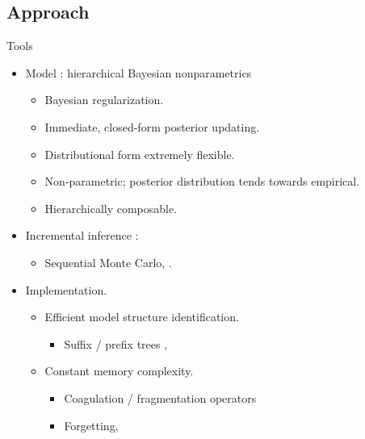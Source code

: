 \documentclass{beamer}
\begin{document}
\subsection{Approach}
\begin{frame}[t]{Tools}
\begin{itemize}
\item Model : hierarchical Bayesian nonparametrics \cite{Teh2006b}
\begin{itemize}
\item Bayesian regularization.
\item Immediate, closed-form posterior updating.
\item Distributional form extremely flexible.
\item Non-parametric; posterior distribution tends towards empirical. 
\item Hierarchically composable.
\end{itemize}
\item Incremental inference : \cite{Doucet2001,Liu2001,MacEachern1999}
\begin{itemize}
\item  Sequential Monte Carlo,  \citet{Wood2007,Wood2008,Wood2008b,Gasthaus2010}.
\end{itemize}
\item Implementation.
\begin{itemize}
\item Efficient model structure identification.
\begin{itemize}
\item Suffix / prefix trees  \cite{Ukkonen1995},\citet{Wood2009}
\end{itemize}

\item Constant memory complexity.
\begin{itemize}
\item Coagulation / fragmentation operators \cite{Pitman1999,Ho2006}
\item Forgetting, \citet{Bartlett2010}
\end{itemize}
\end{itemize}
\end{itemize}


\end{frame}	
\end{document}
